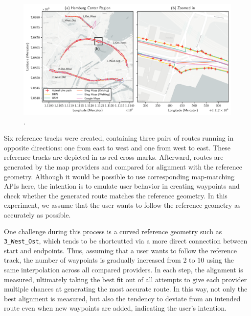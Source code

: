 \begin{figure}[t]
\centering 
\includegraphics[width=\linewidth]{images/routing-hand-drawn-ground-truth.pdf}
\caption{.}
\label{fig:routing-hand-drawn-ground-truth}
\end{figure}

Six reference tracks were created, containing three pairs of routes running in opposite directions: one from east to west and one from west to east. These reference tracks are depicted in  as red cross-marks. Afterward, routes are generated by the map providers and compared for alignment with the reference geometry. Although it would be possible to use corresponding map-matching APIs here, the intention is to emulate user behavior in creating waypoints and check whether the generated route matches the reference geometry. In this experiment, we assume that the user wants to follow the reference geometry as accurately as possible.

One challenge during this process is a curved reference geometry such as \texttt{3\_West\_Ost}, which tends to be shortcutted via a more direct connection between start and endpoints. Thus, assuming that a user wants to follow the reference track, the number of waypoints is gradually increased from 2 to 10 using the same interpolation across all compared providers. In each step, the alignment is measured, ultimately taking the best fit out of all attempts to give each provider multiple chances at generating the most accurate route. In this way, not only the best alignment is measured, but also the tendency to deviate from an intended route even when new waypoints are added, indicating the user's intention.

